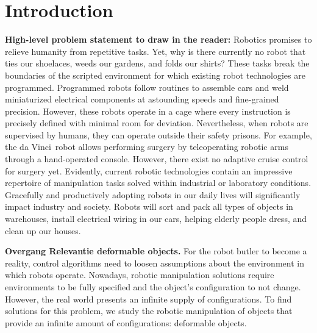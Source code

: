 \documentclass[\home/main.tex]{subfiles}
\begin{document}
\chapter{Introduction}\label{ch:introduction}

\textbf{High-level problem statement to draw in the reader:}
Robotics promises to relieve humanity from repetitive tasks. Yet, why is there currently no robot that ties our shoelaces, weeds our gardens, and folds our shirts?
These tasks break the boundaries of the scripted environment for which existing robot technologies are programmed. Programmed robots follow routines to assemble cars and weld miniaturized electrical components at astounding speeds and fine-grained precision. However, these robots operate in a cage where every instruction is precisely defined with minimal room for deviation. Nevertheless, when robots are supervised by humans, they can operate outside their safety prisons. For example, the da Vinci\textregistered\ robot allows performing surgery by teleoperating robotic arms through a hand-operated console. However, there exist no adaptive cruise control for surgery yet.
Evidently, current robotic technologies contain an impressive repertoire of manipulation tasks solved within industrial or laboratory conditions.
Gracefully and productively adopting robots in our daily lives will significantly impact industry and society. Robots will sort and pack all types of objects in warehouses, install electrical wiring in our cars, helping elderly people dress, and clean up our houses.


\textbf{Overgang Relevantie deformable objects.}
For the robot butler to become a reality, control algorithms need to loosen assumptions about the environment in which robots operate. Nowadays, robotic manipulation solutions require environments to be fully specified and the object's configuration to not change. However, the real world presents an infinite supply of configurations. To find solutions for this problem, we study the robotic manipulation of objects that provide an infinite amount of configurations: deformable objects.
\end{document}
